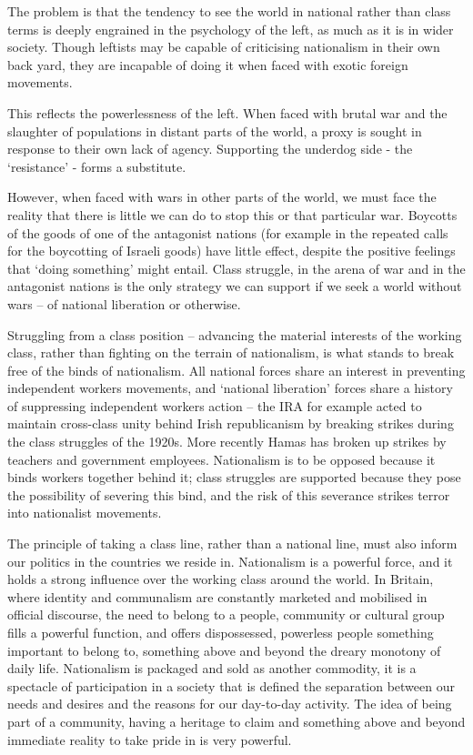 The problem is that the tendency to see the world in national rather than class terms is deeply engrained in the psychology of the left, as much as it is in wider society. Though leftists may be capable of criticising nationalism in their own back yard, they are incapable of doing it when faced with exotic foreign movements.

This reflects the powerlessness of the left. When faced with brutal war and the slaughter of populations in distant parts of the world, a proxy is sought in response to their own lack of agency. Supporting the underdog side - the ‘resistance’ - forms a substitute.

However, when faced with wars in other parts of the world, we must face the reality that there is little we can do to stop this or that particular war. Boycotts of the goods of one of the antagonist nations (for example in the repeated calls for the boycotting of Israeli goods) have little effect, despite the positive feelings that ‘doing something’ might entail. Class struggle, in the arena of war and in the antagonist nations is the only strategy we can support if we seek a world without wars – of national liberation or otherwise.

Struggling from a class position – advancing the material interests of the working class, rather than fighting on the terrain of nationalism, is what stands to break free of the binds of nationalism. All national forces share an interest in preventing independent workers movements, and ‘national liberation’ forces share a history of suppressing independent workers action – the IRA for example acted to maintain cross-class unity behind Irish republicanism by breaking strikes during the class struggles of the 1920s. More recently Hamas has broken up strikes by teachers and government employees. Nationalism is to be opposed because it binds workers together behind it; class struggles are supported because they pose the possibility of severing this bind, and the risk of this severance strikes terror into nationalist movements.

The principle of taking a class line, rather than a national line, must also inform our politics in the countries we reside in. Nationalism is a powerful force, and it holds a strong influence over the working class around the world. In Britain, where identity and communalism are constantly marketed and mobilised in official discourse, the need to belong to a people, community or cultural group fills a powerful function, and offers dispossessed, powerless people something important to belong to, something above and beyond the dreary monotony of daily life. Nationalism is packaged and sold as another commodity, it is a spectacle of participation in a society that is defined the separation between our needs and desires and the reasons for our day-to-day activity. The idea of being part of a community, having a heritage to claim and something above and beyond immediate reality to take pride in is very powerful.

